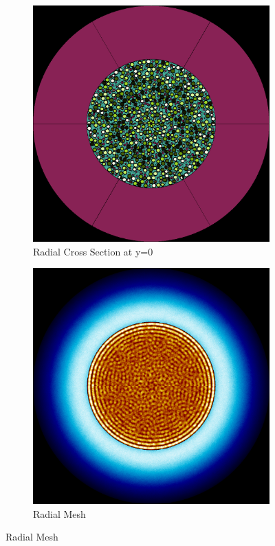 \begin{figure}[H]
\centering

\begin{subfigure}{0.45\textwidth}
  \includegraphics[width=0.95\linewidth]{figures/0-60/0-60-r}
  \caption{Radial Cross Section at y=0}
  \label{fig:0-60-r}
\end{subfigure}%
%
\begin{subfigure}{0.45\textwidth}
  \includegraphics[width=0.95\linewidth]{figures/0-60/0-60-rm}
  \caption{Radial Mesh}
  \label{fig:0-60-rm}
\end{subfigure}


\end{figure}
